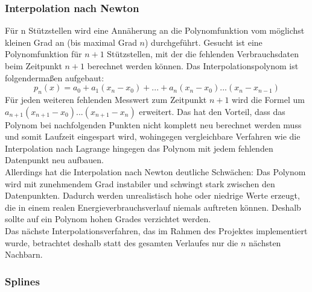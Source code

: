 \subsubsection{Interpolation nach Newton}
Für n Stützstellen wird eine Annäherung an die Polynomfunktion vom möglichst kleinen Grad an (bis maximal Grad $n$) durchgeführt. Gesucht ist eine Polynomfunktion für $n+1$ Stützstellen, mit der die fehlenden Verbrauchsdaten beim Zeitpunkt $n+1$ berechnet werden können. Das Interpolationspolynom ist folgendermaßen aufgebaut:
$$p_n(x)=a_0+a_1(x_n-x_0)+...+a_n(x_n-x_0)...(x_n-x_{n-1})$$
Für jeden weiteren fehlenden Messwert zum Zeitpunkt $n+1$ wird die Formel um $a_{n+1}(x_{n+1}-x_{0})...(x_{n+1}-x_{n})$ erweitert. Das hat den Vorteil, dass das Polynom bei nachfolgenden Punkten nicht komplett neu berechnet werden muss und somit Laufzeit eingespart wird, wohingegen vergleichbare Verfahren wie die Interpolation nach Lagrange hingegen das Polynom mit jedem fehlenden Datenpunkt neu aufbauen.\\
Allerdings hat die Interpolation nach Newton deutliche Schwächen: Das Polynom wird mit zunehmendem Grad instabiler und schwingt stark zwischen den Datenpunkten. Dadurch werden unrealistisch hohe oder niedrige Werte erzeugt, die in einem realen Energieverbrauchsverlauf niemals auftreten können. Deshalb sollte auf ein Polynom hohen Grades verzichtet werden.\\
Das nächste Interpolationsverfahren, das im Rahmen des Projektes implementiert wurde, betrachtet deshalb statt des gesamten Verlaufes nur die $n$ nächsten Nachbarn.

\subsubsection{Splines}

